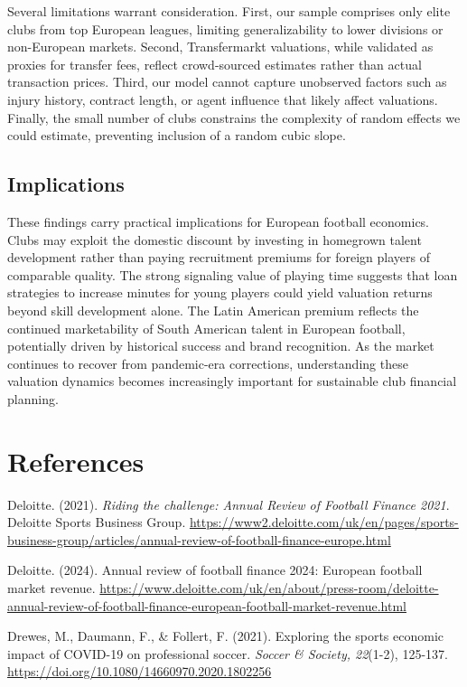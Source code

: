 \documentclass[
  12pt,
]{article}
\begin{document}
Several limitations warrant consideration. First, our sample comprises
only elite clubs from top European leagues, limiting generalizability to
lower divisions or non-European markets. Second, Transfermarkt
valuations, while validated as proxies for transfer fees, reflect
crowd-sourced estimates rather than actual transaction prices. Third,
our model cannot capture unobserved factors such as injury history,
contract length, or agent influence that likely affect valuations.
Finally, the small number of clubs constrains the complexity of random
effects we could estimate, preventing inclusion of a random cubic slope.

\subsection{Implications}\label{implications}

These findings carry practical implications for European football
economics. Clubs may exploit the domestic discount by investing in
homegrown talent development rather than paying recruitment premiums for
foreign players of comparable quality. The strong signaling value of
playing time suggests that loan strategies to increase minutes for young
players could yield valuation returns beyond skill development alone.
The Latin American premium reflects the continued marketability of South
American talent in European football, potentially driven by historical
success and brand recognition. As the market continues to recover from
pandemic-era corrections, understanding these valuation dynamics becomes
increasingly important for sustainable club financial planning.

\newpage

\section{References}\label{references}

Deloitte. (2021). \emph{Riding the challenge: Annual Review of Football
Finance 2021}. Deloitte Sports Business Group.
\url{https://www2.deloitte.com/uk/en/pages/sports-business-group/articles/annual-review-of-football-finance-europe.html}

Deloitte. (2024). Annual review of football finance 2024: European
football market revenue.
\url{https://www.deloitte.com/uk/en/about/press-room/deloitte-annual-review-of-football-finance-european-football-market-revenue.html}

Drewes, M., Daumann, F., \& Follert, F. (2021). Exploring the sports
economic impact of COVID-19 on professional soccer. \emph{Soccer \&
Society, 22}(1-2), 125-137.
\url{https://doi.org/10.1080/14660970.2020.1802256}
\end{document}
